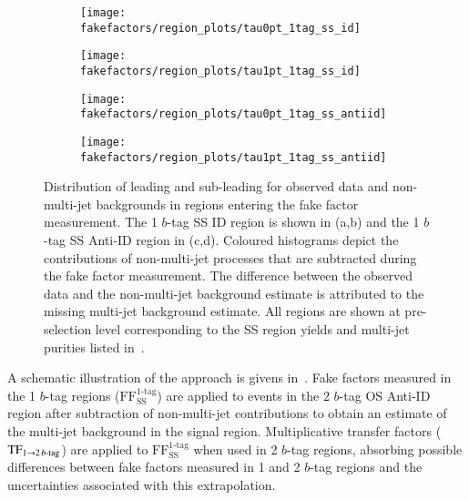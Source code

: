 \begin{figure}[htbp]
  \centering

  \begin{subfigure}{0.49\textwidth}
    \texttt{[image: fakefactors/region\_plots/tau0pt\_1tag\_ss\_id]}
  \end{subfigure}
  \begin{subfigure}{0.49\textwidth}
    \texttt{[image: fakefactors/region\_plots/tau1pt\_1tag\_ss\_id]}
  \end{subfigure}

  \begin{subfigure}{0.49\textwidth}
    \texttt{[image: fakefactors/region\_plots/tau0pt\_1tag\_ss\_antiid]}
  \end{subfigure}
  \begin{subfigure}{0.49\textwidth}
    \texttt{[image: fakefactors/region\_plots/tau1pt\_1tag\_ss\_antiid]}
  \end{subfigure}

  \caption{Distribution of leading and sub-leading \tauhadvis \pT for
    observed data and non-multi-jet backgrounds in regions entering
    the fake factor measurement. The 1 $b$-tag SS ID region is shown
    in (a,b) and the 1 $b$-tag SS Anti-ID region in (c,d). Coloured
    histograms depict the contributions of non-multi-jet processes
    that are subtracted during the fake factor measurement. The
    difference between the observed data and the non-multi-jet
    background estimate is attributed to the missing multi-jet
    background estimate. All regions are shown at pre-selection level
    corresponding to the SS region yields and multi-jet purities
    listed in~.}%
  \label{fig:mjfakes_1tag_ss_plots}
\end{figure}

A schematic illustration of the approach is givens
in~. Fake factors measured in the 1
$b$-tag regions ($\text{FF}_\text{SS}^\text{1-tag}$) are applied to
events in the 2 $b$-tag OS Anti-ID region after subtraction of
non-multi-jet contributions to obtain an estimate of the multi-jet
background in the signal region. Multiplicative transfer factors
($\text{TF}_{1 \rightarrow 2\,b\text{-tag}}$) are applied to
$\text{FF}_\text{SS}^\text{1-tag}$ when used in 2 $b$-tag regions,
absorbing possible differences between fake factors measured in 1 and
2 $b$-tag regions and the uncertainties associated with this
extrapolation.

